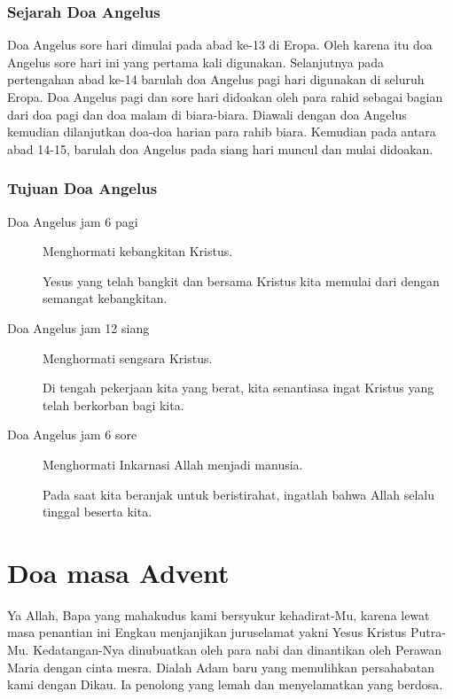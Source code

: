 \documentclass[a5paper,titlepage,11pt]{book}
\begin{document}
\subsubsection*{Sejarah Doa Angelus}
Doa Angelus sore hari dimulai pada abad ke-13 di Eropa.
Oleh karena itu doa Angelus sore hari ini yang pertama kali digunakan.
Selanjutnya pada pertengahan abad ke-14 barulah doa Angelus pagi hari digunakan di seluruh Eropa.
Doa Angelus pagi dan sore hari didoakan oleh para rahid sebagai bagian dari doa pagi dan doa malam di biara-biara.
Diawali dengan doa Angelus kemudian dilanjutkan doa-doa harian para rahib biara.
Kemudian pada antara abad 14-15, barulah doa Angelus pada siang hari muncul dan mulai didoakan.

\normalsize
\subsubsection*{Tujuan Doa Angelus}

\begin{description}
\item[Doa Angelus jam 6 pagi]
Menghormati kebangkitan Kristus.

Yesus yang telah bangkit dan bersama Kristus kita memulai dari dengan semangat kebangkitan.

\item[Doa Angelus jam 12 siang]
Menghormati sengsara Kristus.

Di tengah pekerjaan kita yang berat, kita senantiasa ingat Kristus yang telah berkorban bagi kita.

\item[Doa Angelus jam 6 sore]
Menghormati Inkarnasi Allah menjadi manusia.

Pada saat kita beranjak untuk beristirahat, ingatlah bahwa Allah selalu tinggal beserta kita.
\end{description}%
\small
\section{Doa masa Advent}

    Ya Allah, Bapa yang mahakudus kami bersyukur kehadirat-Mu, karena lewat masa penantian ini Engkau menjanjikan juruselamat yakni Yesus Kristus Putra-Mu. Kedatangan-Nya dinubuatkan oleh para nabi dan dinantikan oleh Perawan Maria dengan cinta mesra. Dialah Adam baru yang memulihkan persahabatan kami dengan Dikau. Ia penolong yang lemah dan menyelamatkan yang berdosa.
\end{document}
